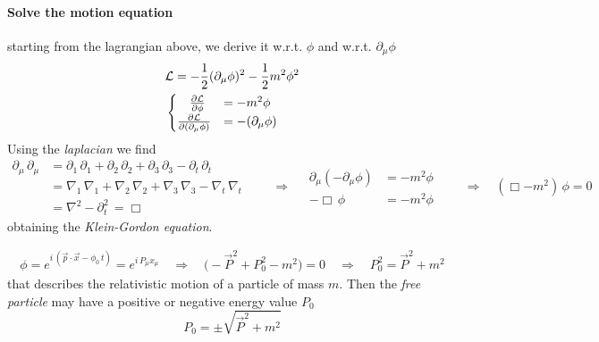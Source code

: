 \documentclass[class=article]{standalone}
\begin{document}
\paragraph{Solve the motion equation} starting from the lagrangian above, we derive it w.r.t. $\phi$ and w.r.t. $\partial_{\mu}\phi$
\begin{equation*}
\begin{split}
& \mathcal{L} = - \frac{1}{2} (\partial_{\mu} \phi)^2 - \frac{1}{2} m^2 \phi^2 \\
&\begin{cases}
\quad \pdv{\mathcal{L}}{\phi} & = - m^2 \phi \\
\pdv{\mathcal{L}}{(\partial_{\mu}\phi)} & = - (\partial_{\mu}\phi)
\end{cases}
\end{split}
\end{equation*}
Using the \emph{laplacian} we find 
\begin{equation*}
\begin{split}
\partial_{\mu}\,\partial_{\mu} & = \partial_{1}\,\partial_{1} + \partial_{2}\,\partial_{2} + \partial_{3}\,\partial_{3} - \partial_{t}\,\partial_{t} \\
& =  \nabla_{1}\,\nabla_{1} + \nabla_{2}\,\nabla_{2} + \nabla_{3}\,\nabla_{3} - \nabla_{t}\,\nabla_{t} \\
& = \nabla^{2} - \partial_{t}^{2} \, = \Box  
\end{split}
\quad\quad\Rightarrow\quad
\begin{split}
\partial_{\mu} (- \partial_{\mu} \phi ) & = - m^2 \phi \\
- \Box \, \phi  & = - m^2 \phi
\end{split}
\quad\quad\Rightarrow\quad ( \Box - m^2 ) \, \phi  = 0
\end{equation*}
obtaining the \emph{Klein-Gordon equation}.

\begin{equation*}
\begin{split}
\phi = e^{ i \, ( \vec p \cdot \vec x - \phi_0 \, t  ) } = e^{ i \, P_{\mu} x_{\mu} } 
\quad\Rightarrow\quad 
\Big(  -\vec P^2 + P_0^2 - m^2  \Big) = 0
\quad\Rightarrow\quad
P_0^2  = \vec P^2 + m^2  
\end{split}
\end{equation*}
that describes the relativistic motion of a particle of mass $m$.
Then the \emph{free particle} may have a positive or negative energy value $P_0$
\begin{equation*}
P_0 = \pm \sqrt{ \vec P^2 + m^2  }
\end{equation*}
\end{document}
